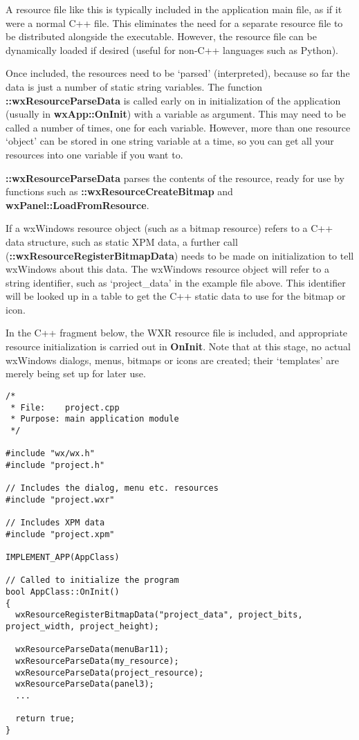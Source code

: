 A resource file like this is typically included in the application main file,
as if it were a normal C++ file. This eliminates the need for a separate
resource file to be distributed alongside the executable. However, the
resource file can be dynamically loaded if desired (useful for non-C++
languages such as Python).

Once included, the resources need to be `parsed' (interpreted), because
so far the data is just a number of static string variables. The function\rtfsp
{\bf ::wxResourceParseData} is called early on in initialization of the application
(usually in {\bf wxApp::OnInit}) with a variable as argument. This may need to be
called a number of times, one for each variable. However, more than one
resource `object' can be stored in one string variable at a time, so you can
get all your resources into one variable if you want to.

{\bf ::wxResourceParseData} parses the contents of the resource, ready for use
by functions such as {\bf ::wxResourceCreateBitmap} and {\bf wxPanel::LoadFromResource}.

If a wxWindows resource object (such as a bitmap resource) refers to a
C++ data structure, such as static XPM data, a further call ({\bf ::wxResourceRegisterBitmapData}) needs
to be made on initialization to tell
wxWindows about this data. The wxWindows resource object will refer to a
string identifier, such as `project\_data' in the example file above.
This identifier will be looked up in a table to get the C++ static data
to use for the bitmap or icon.

In the C++ fragment below, the WXR resource file is included,
and appropriate resource initialization is carried out in {\bf OnInit}.
Note that at this stage, no actual wxWindows dialogs, menus, bitmaps or
icons are created; their `templates' are merely being set up for later
use.

\begin{verbatim}
/*
 * File:    project.cpp
 * Purpose: main application module
 */

#include "wx/wx.h"
#include "project.h"

// Includes the dialog, menu etc. resources
#include "project.wxr"

// Includes XPM data
#include "project.xpm"

IMPLEMENT_APP(AppClass)

// Called to initialize the program
bool AppClass::OnInit()
{
  wxResourceRegisterBitmapData("project_data", project_bits, project_width, project_height);

  wxResourceParseData(menuBar11);
  wxResourceParseData(my_resource);
  wxResourceParseData(project_resource);
  wxResourceParseData(panel3);
  ...

  return true;
}
\end{verbatim}

